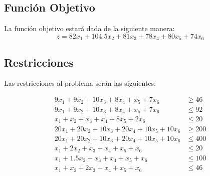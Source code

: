 \documentclass[10pt,letterpaper]{book}
\begin{document}
\subsection*{Función Objetivo}
La función objetivo estará dada de la  siguiente manera:
$$
z = 82x_1 + 104.5x_2 + 81x_3 + 78x_4 + 80x_5 + 74x_6
$$
\subsection*{Restricciones}
Las restricciones al problema serán las siguientes:

\begin{align*}
9x_1 + 9x_2 + 10x_3 + 8x_4 + x_5 + 7x_6 &\geq 46 \\
9x_1 + 9x_2 + 10x_3 + 8x_4 + x_5 + 7x_6 &\leq 92 \\
x_1 + x_2 + x_3 + x_4 + 8x_5 + 2x_6 &\leq 20 \\
20x_1 + 20x_2 + 10x_3 + 20x_4 + 10x_5 + 10x_6 &\geq 200 \\
20x_1 + 20x_2 + 10x_3 + 20x_4 + 10x_5 + 10x_6 &\leq 400 \\
x_1 + 2x_2 + x_3 + x_4 + x_5 + x_6 &\leq 20 \\
x_1 +1.5x_2 + x_3 + x_4 + x_5 + x_6 &\leq 100 \\
x_1 + x_2 + 2x_3 + x_4 + x_5 + x_6 &\leq 46
\end{align*}
\end{document}
